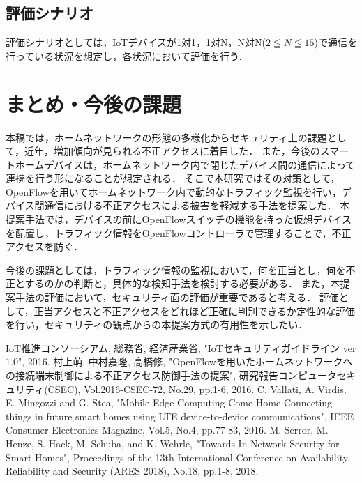 \documentclass[a4paper,10pt,twocolumn,uplatex]{jsarticle}
\begin{document}
\subsection{評価シナリオ}
評価シナリオとしては，IoTデバイスが1対1，1対N，N対N($2\leqq N \leqq 15$)で通信を行っている状況を想定し，各状況において評価を行う．

\section{まとめ・今後の課題}
本稿では，ホームネットワークの形態の多様化からセキュリティ上の課題として，近年，増加傾向が見られる不正アクセスに着目した．
また，今後のスマートホームデバイスは，ホームネットワーク内で閉じたデバイス間の通信によって連携を行う形になることが想定される．
そこで本研究ではその対策として，OpenFlowを用いてホームネットワーク内で動的なトラフィック監視を行い，デバイス間通信における不正アクセスによる被害を軽減する手法を提案した．
本提案手法では，デバイスの前にOpenFlowスイッチの機能を持った仮想デバイスを配置し，トラフィック情報をOpenFlowコントローラで管理することで，不正アクセスを防ぐ．
\par
今後の課題としては，トラフィック情報の監視において，何を正当とし，何を不正とするのかの判断と，具体的な検知手法を検討する必要がある．
また，本提案手法の評価において，セキュリティ面の評価が重要であると考える．
評価として，正当アクセスと不正アクセスをどれほど正確に判別できるか定性的な評価を行い，セキュリティの観点からの本提案方式の有用性を示したい．

\footnotesize{
  \begin{thebibliography}{99}
     IoT推進コンソーシアム, 総務省, 経済産業省, "IoTセキュリティガイドライン ver 1.0", 2016.
     村上萌, 中村嘉隆, 高橋修, "OpenFlowを用いたホームネットワークへの接続端末制御による不正アクセス防御手法の提案", 研究報告コンピュータセキュリティ(CSEC), Vol.2016-CSEC-72, No.29, pp.1-6, 2016.
     C. Vallati, A. Virdis, E. Mingozzi and G. Stea, "Mobile-Edge Computing Come Home Connecting things in future smart homes using LTE device-to-device communications", IEEE Consumer Electronics Magazine, Vol.5, No.4, pp.77-83, 2016.
     M. Serror, M. Henze, S. Hack, M. Schuba, and K. Wehrle, "Towards In-Network Security for Smart Homes", Proceedings of the 13th International Conference on Availability, Reliability and Security (ARES 2018), No.18, pp.1-8, 2018.
  \end{thebibliography}
}

\end{document}
